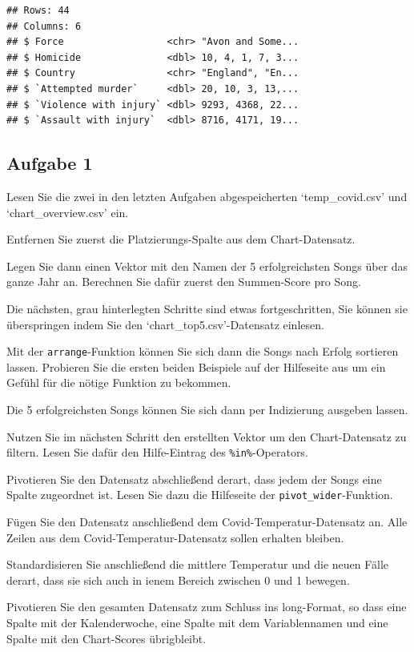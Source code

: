 \documentclass[
]{book}
\begin{document}
\begin{verbatim}
## Rows: 44
## Columns: 6
## $ Force                  <chr> "Avon and Some...
## $ Homicide               <dbl> 10, 4, 1, 7, 3...
## $ Country                <chr> "England", "En...
## $ `Attempted murder`     <dbl> 20, 10, 3, 13,...
## $ `Violence with injury` <dbl> 9293, 4368, 22...
## $ `Assault with injury`  <dbl> 8716, 4171, 19...
\end{verbatim}

\hypertarget{aufgabe-1-4}{%
\subsection{Aufgabe 1}\label{aufgabe-1-4}}

Lesen Sie die zwei in den letzten Aufgaben abgespeicherten `temp\_covid.csv' und `chart\_overview.csv' ein.

Entfernen Sie zuerst die Platzierungs-Spalte aus dem Chart-Datensatz.

Legen Sie dann einen Vektor mit den Namen der 5 erfolgreichsten Songs über das ganze Jahr an. Berechnen Sie dafür zuerst den Summen-Score pro Song.

Die nächsten, grau hinterlegten Schritte sind etwas fortgeschritten, Sie können sie überspringen indem Sie den `chart\_top5.csv'-Datensatz einlesen.

Mit der \texttt{arrange}-Funktion können Sie sich dann die Songs nach Erfolg sortieren lassen. Probieren Sie die ersten beiden Beispiele auf der Hilfeseite aus um ein Gefühl für die nötige Funktion zu bekommen.

Die 5 erfolgreichsten Songs können Sie sich dann per Indizierung ausgeben lassen.

Nutzen Sie im nächsten Schritt den erstellten Vektor um den Chart-Datensatz zu filtern. Lesen Sie dafür den Hilfe-Eintrag des \texttt{\%in\%}-Operators.

Pivotieren Sie den Datensatz abschließend derart, dass jedem der Songs eine Spalte zugeordnet ist. Lesen Sie dazu die Hilfeseite der \texttt{pivot\_wider}-Funktion.

Fügen Sie den Datensatz anschließend dem Covid-Temperatur-Datensatz an. Alle Zeilen aus dem Covid-Temperatur-Datensatz sollen erhalten bleiben.

Standardisieren Sie anschließend die mittlere Temperatur und die neuen Fälle derart, dass sie sich auch in ienem Bereich zwischen 0 und 1 bewegen.

Pivotieren Sie den gesamten Datensatz zum Schluss ins long-Format, so dass eine Spalte mit der Kalenderwoche, eine Spalte mit dem Variablennamen und eine Spalte mit den Chart-Scores übrigbleibt.
\end{document}
